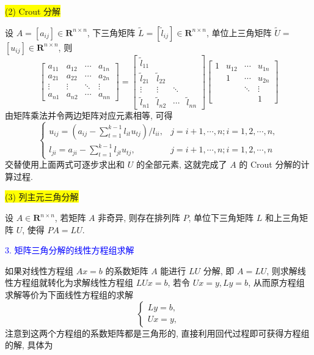 \colorbox{yellow}{(2) Crout 分解}

设 $ A=\left[a_{i j}\right] \in \mathbf{R}^{n \times n} $, 下三角矩阵 $ \tilde{L}=\left[\tilde{l}_{i j}\right] \in \mathbf{R}^{n \times n} $, 单位上三角矩阵 $ \tilde{U}= $ $ \left[u_{i j}\right] \in \mathbf{R}^{n \times n} $, 则
$$
\left[\begin{array}{cccc}
a_{11} & a_{12} & \cdots & a_{1 n} \\
a_{21} & a_{22} & \cdots & a_{2 n} \\
\vdots & \vdots & \ddots & \vdots \\
a_{n 1} & a_{n 2} & \cdots & a_{n n}
\end{array}\right]=\left[\begin{array}{cccc}
\tilde{l}_{11} & & & \\
\tilde{l}_{21} & \tilde{l}_{22} & & \\
\vdots & \vdots & \ddots & \\
\tilde{l}_{n 1} & \tilde{l}_{n 2} & \cdots & \tilde{l}_{n n}
\end{array}\right]\left[\begin{array}{cccc}
1 & u_{12} & \cdots & u_{1 n} \\
& 1 & \cdots & u_{2 n} \\
& & \ddots & \vdots \\
& & & 1
\end{array}\right]
$$
由矩阵乘法并令两边矩阵对应元素相等, 可得
$$
\left\{\begin{array}{ll}
u_{i j}=\left(a_{i j}-\sum\limits_{t=1}^{k-1} l_{i t} u_{t j}\right) / l_{i i}, & j=i+1, \cdots, n ; i=1,2, \cdots, n, \\
l_{j i}=a_{j i}-\sum\limits_{t=1}^{k-1} l_{j t} u_{t j}, & j=i+1, \cdots, n ; i=1,2, \cdots, n
\end{array}\right.
$$
交替使用上面两式可逐步求出和 $ U $ 的全部元素, 这就完成了 $ A $ 的 Crout 分解的计算过程.

\colorbox{yellow}{(3) 列主元三角分解}

设 $ A \in \mathbf{R}^{n \times n} $, 若矩阵 $ A $ 非奇异, 则存在排列阵 $ P $, 单位下三角矩阵 $ L $ 和上三角矩阵 $ U $, 使得 $ P A=L U $.

\textcolor{blue}{3. 矩阵三角分解的线性方程组求解}

如果对线性方程组 $ A x=b $ 的系数矩阵 $ A $ 能进行 $ {LU} $ 分解, 即 $ A=L U $, 则求解线性方程组就转化为求解线性方程组 $ L U x=b $, 若令 $ U x=y, L y=b $, 从而原方程组求解等价为下面线性方程组的求解 $$ \left\{\begin{array}{l}L y=b, \\ U x=y,\end{array}\right. $$ 注意到这两个方程组的系数矩阵都是三角形的, 直接利用回代过程即可获得方程组的解, 具体为

